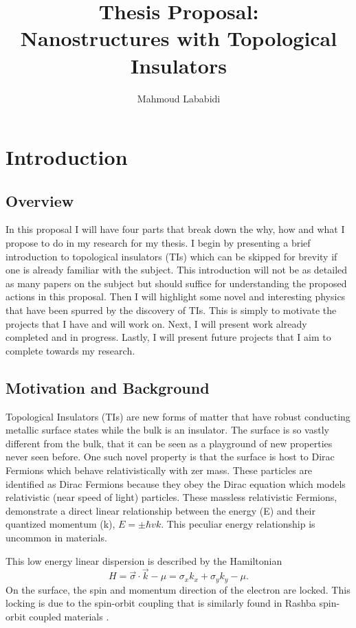 \documentclass[11pt,revtex,aps]{report}
\title{Thesis Proposal: \\Nanostructures with Topological Insulators}
\author{Mahmoud Lababidi}
\begin{document}
\maketitle
\tableofcontents

\chapter{Introduction}
\section{Overview}
In this proposal I will have four parts that break down the why, how and what I propose to do in my research for my thesis. I begin by presenting a brief introduction to topological insulators (TIs) which can be skipped for brevity if one is already familiar with the subject. This introduction will not be as detailed as many papers on the subject but should suffice for understanding the proposed actions in this proposal. Then I will highlight some novel and interesting physics that have been spurred by the discovery of TIs. This is simply to motivate the projects that I have and will work on. Next, I will present work already completed and in progress. Lastly, I will present future projects that I aim to complete towards my research. 


\section{Motivation and Background}
Topological Insulators (TIs) are new forms of matter that have robust conducting metallic surface states while the bulk is an insulator. The surface is so vastly different from the bulk, that it can be seen as a playground of new properties never seen before. One such novel property is that the surface is host to Dirac Fermions which behave relativistically with zer mass. These particles are identified as  Dirac Fermions because they obey the Dirac equation which models relativistic (near speed of light) particles. These massless relativistic Fermions, demonstrate a direct linear relationship between the energy (E) and their quantized momentum (k), $E=\pm\hbar v k$. This peculiar energy relationship is uncommon in  materials. 

This low energy linear dispersion is described by the Hamiltonian
\begin{equation}
H=\vec{\sigma}\cdot \vec{k}-\mu=\sigma_x k_x + \sigma_y k_y - \mu.
\end{equation}
On the surface, the spin and momentum direction of the electron are locked. This locking is due to the spin-orbit coupling that is similarly found in Rashba spin-orbit coupled materials \cite{jason}.
\end{document}
